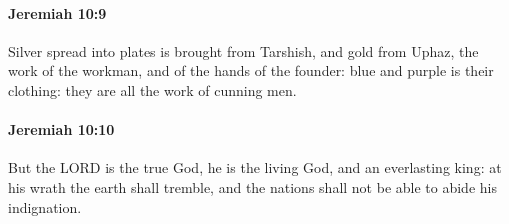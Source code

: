 		\paragraph{Jeremiah 10:9} %
			\label{JEREMIAH-10-9}

			Silver spread into plates is brought from Tarshish, and gold from Uphaz, the work of the workman, and of the hands of the founder: blue and purple is their clothing: they are all the work of cunning men.


		\paragraph{Jeremiah 10:10} %
			\label{JEREMIAH-10-10}

			But the LORD is the true God, he is the living God, and an everlasting king: at his wrath the earth shall tremble, and the nations shall not be able to abide his indignation.

